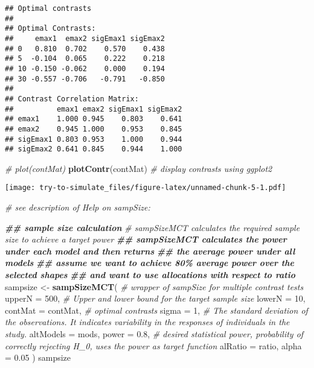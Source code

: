\documentclass[
]{article}
\newenvironment{Shaded}{\begin{snugshade}}{\end{snugshade}}
\newcommand{\AttributeTok}[1]{\textcolor[rgb]{0.13,0.29,0.53}{#1}}
\newcommand{\CommentTok}[1]{\textcolor[rgb]{0.56,0.35,0.01}{\textit{#1}}}
\newcommand{\DecValTok}[1]{\textcolor[rgb]{0.00,0.00,0.81}{#1}}
\newcommand{\DocumentationTok}[1]{\textcolor[rgb]{0.56,0.35,0.01}{\textbf{\textit{#1}}}}
\newcommand{\FloatTok}[1]{\textcolor[rgb]{0.00,0.00,0.81}{#1}}
\newcommand{\FunctionTok}[1]{\textcolor[rgb]{0.13,0.29,0.53}{\textbf{#1}}}
\newcommand{\NormalTok}[1]{#1}
\newcommand{\OtherTok}[1]{\textcolor[rgb]{0.56,0.35,0.01}{#1}}
\begin{document}
\begin{verbatim}
## Optimal contrasts
## 
## Optimal Contrasts:
##     emax1  emax2 sigEmax1 sigEmax2
## 0   0.810  0.702    0.570    0.438
## 5  -0.104  0.065    0.222    0.218
## 10 -0.150 -0.062    0.000    0.194
## 30 -0.557 -0.706   -0.791   -0.850
## 
## Contrast Correlation Matrix:
##          emax1 emax2 sigEmax1 sigEmax2
## emax1    1.000 0.945    0.803    0.641
## emax2    0.945 1.000    0.953    0.845
## sigEmax1 0.803 0.953    1.000    0.944
## sigEmax2 0.641 0.845    0.944    1.000
\end{verbatim}

\begin{Shaded}
\begin{Highlighting}[]
\CommentTok{\# plot(contMat)}
\FunctionTok{plotContr}\NormalTok{(contMat) }\CommentTok{\# display contrasts using ggplot2}
\end{Highlighting}
\end{Shaded}

\texttt{[image: try-to-simulate\_files/figure-latex/unnamed-chunk-5-1.pdf]}

\begin{Shaded}
\begin{Highlighting}[]
\CommentTok{\# see description of Help on sampSize:}

\DocumentationTok{\#\# sample size calculation}
\CommentTok{\# sampSizeMCT calculates the required sample size to achieve a target power}
\DocumentationTok{\#\# sampSizeMCT calculates the power under each model and then returns}
\DocumentationTok{\#\# the average power under all models}
\DocumentationTok{\#\# assume we want to achieve 80\% average power over the selected shapes}
\DocumentationTok{\#\# and want to use allocations with respect to ratio}
\NormalTok{sampsize }\OtherTok{\textless{}{-}} \FunctionTok{sampSizeMCT}\NormalTok{( }\CommentTok{\# wrapper of sampSize for multiple contrast tests}
  \AttributeTok{upperN =} \DecValTok{500}\NormalTok{, }\CommentTok{\# Upper and lower bound for the target sample size}
  \AttributeTok{lowerN =} \DecValTok{10}\NormalTok{,}
  \AttributeTok{contMat =}\NormalTok{ contMat, }\CommentTok{\# optimal contrasts}
  \AttributeTok{sigma =} \DecValTok{1}\NormalTok{, }\CommentTok{\# The standard deviation of the observations. It indicates variability in the responses of individuals in the study.}
  \AttributeTok{altModels =}\NormalTok{ mods,}
  \AttributeTok{power =} \FloatTok{0.8}\NormalTok{, }\CommentTok{\# desired statistical power, probability of correctly rejecting H\_0, uses the power as target function}
  \AttributeTok{alRatio =}\NormalTok{ ratio,}
  \AttributeTok{alpha =} \FloatTok{0.05}
\NormalTok{)}
\NormalTok{sampsize}
\end{Highlighting}
\end{Shaded}
\end{document}
